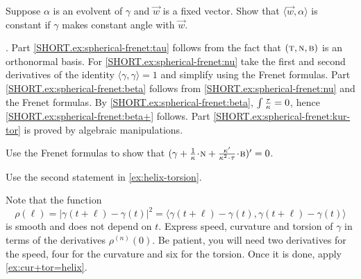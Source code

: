 Suppose $\alpha$ is an evolvent of $\gamma$ and $\vec w$ is a fixed vector.
Show that $\langle \vec w,\alpha\rangle$ is constant if $\gamma$ makes constant angle with $\vec w$.

\parbf{\ref{ex:spherical-frenet}}.
Part \ref{SHORT.ex:spherical-frenet:tau} follows from the fact that $(  \text{\sc{t}} , \text{\sc{n}}, \text{\sc{b}}  )$ is an orthonormal basis. For \ref{SHORT.ex:spherical-frenet:nu} take the first and second derivatives of the identity $\langle\gamma,\gamma\rangle=1$ and simplify using the Frenet formulas.
Part \ref{SHORT.ex:spherical-frenet:beta} follows from \ref{SHORT.ex:spherical-frenet:nu} and the Frenet formulas.
By \ref{SHORT.ex:spherical-frenet:beta}, $\int\tfrac{\tau}{\kappa}=0$, hence \ref{SHORT.ex:spherical-frenet:beta+} follows.
Part \ref{SHORT.ex:spherical-frenet:kur-tor} is proved by algebraic manipulations.

Use the Frenet formulas to show that $(\gamma+\tfrac1\kur\cdot \norm+\tfrac{\kur'}{\kur^2\cdot\tor}\cdot\bi)'=0$.



 Use the second statement in \ref{ex:helix-torsion}.

 Note that the function
\[\rho(\ell)=|\gamma(t+\ell)-\gamma(t)|^2=\langle \gamma(t+\ell)-\gamma(t),\gamma(t+\ell)-\gamma(t)\rangle\] 
is smooth and does not depend on $t$.
Express speed, curvature and torsion of $\gamma$ in terms of the derivatives $\rho^{(n)}(0)$.
Be patient, you will need two derivatives for the speed,
four for the curvature and six for the torsion.
Once it is done, apply \ref{ex:cur+tor=helix}.
